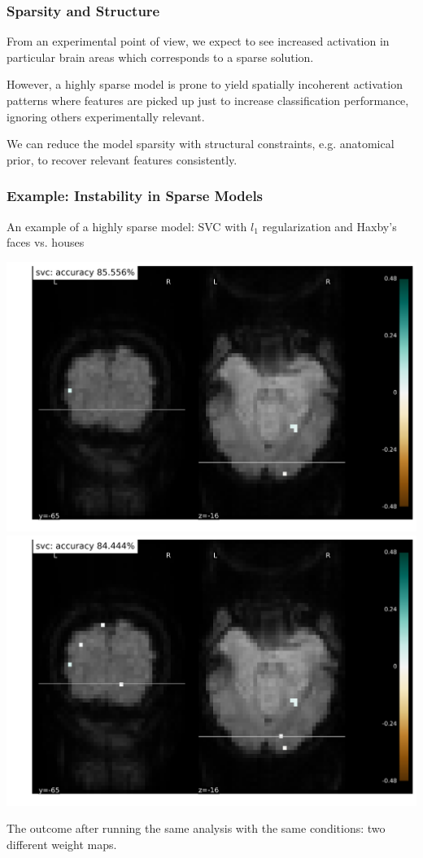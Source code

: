 \documentclass[11pt]{beamer}
\begin{document}
\begin{frame}[t,shrink]
  \frametitle{Sparsity and Structure}
  From an experimental point of view, we expect to see increased activation in particular brain
  areas which corresponds to a sparse solution.
  
  However, a highly sparse model is prone to yield spatially incoherent activation
  patterns where features are picked up just to increase classification
  performance, ignoring others experimentally relevant.

  We can reduce the model sparsity with structural constraints, e.g. anatomical prior,
  to recover relevant features consistently.
\end{frame}
\begin{frame}
  \frametitle{Example: Instability in Sparse Models}
  An example of a highly sparse model: SVC with $l_1$ regularization and Haxby's
  faces vs. houses
    \begin{center}
      \includegraphics[scale=0.22]{figures/haxby_svc_plotmap_7e41.png}
      \includegraphics[scale=0.22]{figures/haxby_svc_plotmap_b073.png}
    \end{center}
    The outcome after running the same analysis with the same conditions: two
    different weight maps.
\end{frame}
\end{document}
